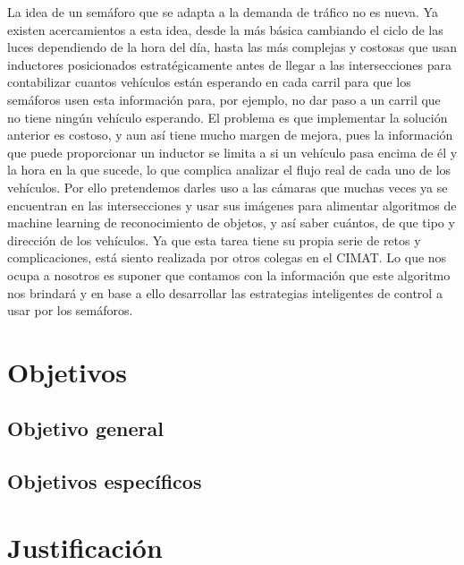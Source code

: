 La idea de un semáforo que se adapta a la demanda de tráfico no es
nueva. Ya existen acercamientos a esta idea, desde la más básica
cambiando el ciclo de las luces dependiendo de la hora del día, hasta
las más complejas y costosas que usan inductores posicionados
estratégicamente antes de llegar a las intersecciones para contabilizar
cuantos vehículos están esperando en cada carril para que los semáforos
usen esta información para, por ejemplo, no dar paso a un carril que no
tiene ningún vehículo esperando. El problema es que implementar la
solución anterior es costoso, y aun así tiene mucho margen de mejora,
pues la información que puede proporcionar un inductor se limita a si un
vehículo pasa encima de él y la hora en la que sucede, lo que complica
analizar el flujo real de cada uno de los vehículos. Por ello
pretendemos darles uso a las cámaras que muchas veces ya se encuentran
en las intersecciones y usar sus imágenes para alimentar algoritmos de
machine learning de reconocimiento de objetos, y así saber cuántos, de
que tipo y dirección de los vehículos. Ya que esta tarea tiene su propia
serie de retos y complicaciones, está siento realizada por otros colegas
en el CIMAT. Lo que nos ocupa a nosotros es suponer que contamos con la
información que este algoritmo nos brindará y en base a ello desarrollar
las estrategias inteligentes de control a usar por los semáforos.

\hypertarget{objetivos}{%
\section{Objetivos}\label{objetivos}}

\hypertarget{objetivo-general}{%
\subsection{Objetivo general}\label{objetivo-general}}

\hypertarget{objetivos-especuxedficos}{%
\subsection{Objetivos específicos}\label{objetivos-especuxedficos}}

\hypertarget{justificaciuxf3n}{%
\section{Justificación}\label{justificaciuxf3n}}

\clearpage %
